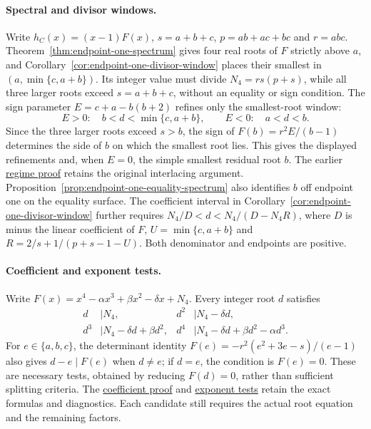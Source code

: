 \paragraph{Spectral and divisor windows.}
Write $h_C(x)=(x-1)F(x)$, $s=a+b+c$, $p=ab+ac+bc$ and $r=abc$.
Theorem~\ref{thm:endpoint-one-spectrum} gives four real roots of $F$
strictly above $a$, and Corollary~\ref{cor:endpoint-one-divisor-window}
places their smallest in $(a,\min\{c,a+b\})$. Its integer value must
divide $N_4=rs(p+s)$, while all three larger roots exceed $s=a+b+c$,
without an equality or sign condition. The sign parameter
$E=c+a-b(b+2)$ refines only the smallest-root window:
\[
 E>0:\quad b<d<\min\{c,a+b\},\qquad
 E<0:\quad a<d<b.
\]
Since the three larger roots exceed $s>b$, the sign of
$F(b)=r^2E/(b-1)$ determines the side of $b$ on which the smallest
root lies. This gives the displayed refinements and, when $E=0$,
the simple smallest residual root $b$. The earlier
\href{https://github.com/the-omega-institute/ideal-intersection-laplacian/blob/4afe151e1dc7193e6776cc1b08d3606aa804238e/notes/endpoint-one-middle-root.md}{regime proof}
retains the original interlacing argument. Proposition~\ref{prop:endpoint-one-equality-spectrum}
also identifies $b$ off endpoint one on the equality surface.
The coefficient interval in Corollary~\ref{cor:endpoint-one-divisor-window}
further requires $N_4/D<d<N_4/(D-N_4R)$, where $D$ is minus the
linear coefficient of $F$, $U=\min\{c,a+b\}$ and
$R=2/s+1/(p+s-1-U)$. Both denominator and endpoints are positive.

\paragraph{Coefficient and exponent tests.}
Write $F(x)=x^4-\alpha x^3+\beta x^2-\delta x+N_4$. Every integer
root $d$ satisfies
\begin{align*}
 d&\mid N_4, & d^2&\mid N_4-\delta d,\\
 d^3&\mid N_4-\delta d+\beta d^2,
 & d^4&\mid N_4-\delta d+\beta d^2-\alpha d^3.
\end{align*}
For $e\in\{a,b,c\}$, the determinant identity
$F(e)=-r^2(e^2+3e-s)/(e-1)$ also gives $d-e\mid F(e)$ when $d\ne e$;
if $d=e$, the condition is $F(e)=0$. These are necessary tests, obtained
by reducing $F(d)=0$, rather than sufficient splitting criteria. The
\href{https://github.com/the-omega-institute/ideal-intersection-laplacian/blob/4afe151e1dc7193e6776cc1b08d3606aa804238e/notes/endpoint-one-root-hierarchy.md}{coefficient proof}
and
\href{https://github.com/the-omega-institute/ideal-intersection-laplacian/blob/4afe151e1dc7193e6776cc1b08d3606aa804238e/notes/endpoint-one-root-congruences.md}{exponent tests}
retain the exact formulas and diagnostics. Each candidate still requires
the actual root equation and the remaining factors.

